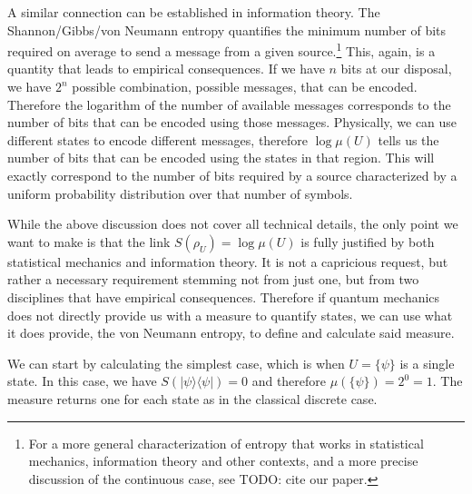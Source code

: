 \documentclass[10pt,twocolumn, nofootinbib]{revtex4-2}
\def\>{\rangle}
\def\<{\langle}
\begin{document}
A similar connection can be established in information theory. The Shannon/Gibbs/von Neumann entropy quantifies the minimum number of bits required on average to send a message from a given source.\footnote{For a more general characterization of entropy that works in statistical mechanics, information theory and other contexts, and a more precise discussion of the continuous case, see TODO: cite our paper.} This, again, is a quantity that leads to empirical consequences. If we have $n$ bits at our disposal, we have $2^n$ possible combination, possible messages, that can be encoded. Therefore the logarithm of the number of available messages corresponds to the number of bits that can be encoded using those messages. Physically, we can use different states to encode different messages, therefore $\log \mu(U)$ tells us the number of bits that can be encoded using the states in that region. This will exactly correspond to the number of bits required by a source characterized by a uniform probability distribution over that number of symbols.

While the above discussion does not cover all technical details, the only point we want to make is that the link $S(\rho_U) = \log \mu(U)$ is fully justified by both statistical mechanics and information theory. It is not a capricious request, but rather a necessary requirement stemming not from just one, but from two disciplines that have empirical consequences. Therefore if quantum mechanics does not directly provide us with a measure to quantify states, we can use what it does provide, the von Neumann entropy, to define and calculate said measure.

We can start by calculating the simplest case, which is when $U = \{ \psi \}$ is a single state. In this case, we have $S(|\psi\>\<\psi|) = 0$ and therefore $\mu(\{\psi\}) = 2^{0} = 1$. The measure returns one for each state as in the classical discrete case.
\end{document}
